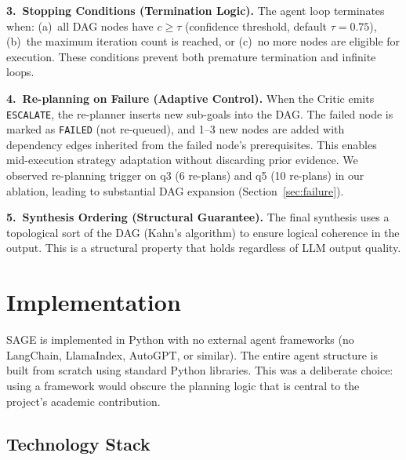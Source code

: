 \documentclass[11pt]{article}
\begin{document}
\textbf{3.\ Stopping Conditions (Termination Logic).} The agent loop terminates when: (a)~all DAG nodes have $c \geq \tau$ (confidence threshold, default $\tau = 0.75$), (b)~the maximum iteration count is reached, or (c)~no more nodes are eligible for execution. These conditions prevent both premature termination and infinite loops.

\textbf{4.\ Re-planning on Failure (Adaptive Control).} When the Critic emits \texttt{ESCALATE}, the re-planner inserts new sub-goals into the DAG. The failed node is marked as \texttt{FAILED} (not re-queued), and 1--3 new nodes are added with dependency edges inherited from the failed node's prerequisites. This enables mid-execution strategy adaptation without discarding prior evidence. We observed re-planning trigger on q3 (6 re-plans) and q5 (10 re-plans) in our ablation, leading to substantial DAG expansion (Section~\ref{sec:failure}).

\textbf{5.\ Synthesis Ordering (Structural Guarantee).} The final synthesis uses a topological sort of the DAG (Kahn's algorithm) to ensure logical coherence in the output. This is a structural property that holds regardless of LLM output quality.

\section{Implementation}

SAGE is implemented in Python with no external agent frameworks (no LangChain, LlamaIndex, AutoGPT, or similar). The entire agent structure is built from scratch using standard Python libraries. This was a deliberate choice: using a framework would obscure the planning logic that is central to the project's academic contribution.

\subsection{Technology Stack}
\end{document}

